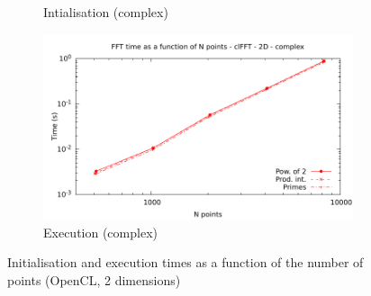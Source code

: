 \documentclass[12pt, a4paper]{article}
\begin{document}
\begin{figure}[H]
\begin{subfigure}{.5\textwidth}
\caption{Intialisation (complex)}
\label{FFTCL2DCI}
\end{subfigure}%
\begin{subfigure}{.5\textwidth}
\centering
\includegraphics[width=.9\linewidth]{graphs/fft-opencl-2d-pow2-c-exec.pdf}
\caption{Execution (complex)}
\label{FFTCL2DCE}
\end{subfigure}
\caption{Initialisation and execution times as a function of the number of points (OpenCL, 2 dimensions)}
\label{FFTCL2D}
\end{figure}
\end{document}
